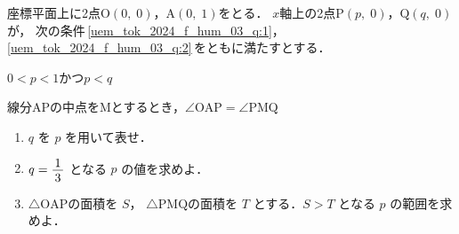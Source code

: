 ﻿\documentclass[../../../uem_tok_q.tex]{subfiles}
\begin{document}
    座標平面上に2点$\mathrm{O}(0,\;0)$，$\mathrm{A}(0,\;1)$をとる．%
    $x$軸上の2点$\mathrm{P}(p,\;0)$，$\mathrm{Q}(q,\;0)$が，%
    次の条件\,\ref{uem_tok_2024_f_hum_03_q:1}，\ref{uem_tok_2024_f_hum_03_q:2}\,をともに満たすとする．
    
    \begin{myenua}
            \item $0<p<1$\;\;かつ\;\;$p<q$ \label{uem_tok_2024_f_hum_03_q:1}
            \item 線分APの中点をMとするとき，$\angle\mathrm{OAP}=\angle\mathrm{PMQ}$%
                \label{uem_tok_2024_f_hum_03_q:2}
    \end{myenua}
    \begin{enumerate}
        \item $q$ を $p$ を用いて表せ．
        \item $q=\myfraca{1}{3}$ となる $p$ の値を求めよ．
        \item $\triangle\mathrm{OAP}$の面積を $S$，%
            $\triangle\mathrm{PMQ}$の面積を $T$ とする．$S>T$ となる $p$ の範囲を求めよ．
    \end{enumerate}
\end{document}
